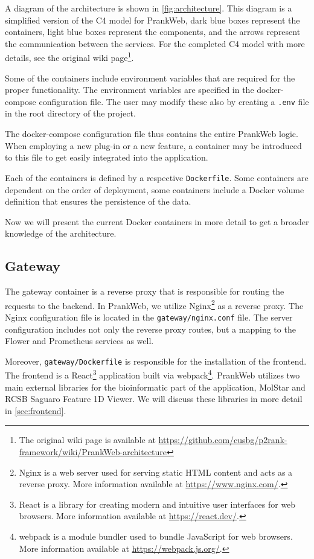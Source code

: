 A diagram of the architecture is shown in \cref{fig:architecture}. This diagram is a simplified version of the C4 model \cite{vazquez2020c4} for PrankWeb, dark blue boxes represent the containers, light blue boxes represent the components, and the arrows represent the communication between the services. For the completed C4 model with more details, see the original wiki page\footnote{The original wiki page is available at \url{https://github.com/cusbg/p2rank-framework/wiki/PrankWeb-architecture}}.


Some of the containers include environment variables that are required for the proper functionality. The environment variables are specified in the docker-compose configuration file. The user may modify these also by creating a \texttt{.env} file in the root directory of the project.

The docker-compose configuration file thus contains the entire PrankWeb logic. When employing a new plug-in or a new feature, a container may be introduced to this file to get easily integrated into the application.

Each of the containers is defined by a respective \texttt{Dockerfile}. Some containers are dependent on the order of deployment, some containers include a Docker volume definition that ensures the persistence of the data.

Now we will present the current Docker containers in more detail to get a broader knowledge of the architecture.

\subsection{Gateway}
\label{subsec:gateway}

The gateway container is a reverse proxy that is responsible for routing the requests to the backend. In PrankWeb, we utilize Nginx\footnote{Nginx is a web server used for serving static HTML content and acts as a reverse proxy. More information available at \url{https://www.nginx.com/}.} as a reverse proxy. The Nginx configuration file is located in the \texttt{gateway/nginx.conf} file. The server configuration includes not only the reverse proxy routes, but a mapping to the Flower and Prometheus services as well.

Moreover, \texttt{gateway/Dockerfile} is responsible for the installation of the frontend. The frontend is a React\footnote{React is a library for creating modern and intuitive user interfaces for web browsers. More information available at \url{https://react.dev/}.} application built via webpack\footnote{webpack is a module bundler used to bundle JavaScript for web browsers. More information available at \url{https://webpack.js.org/}.}. PrankWeb utilizes two main external libraries for the bioinformatic part of the application, MolStar and RCSB Saguaro Feature 1D Viewer. We will discuss these libraries in more detail in \cref{sec:frontend}.

